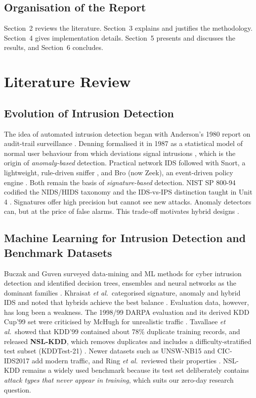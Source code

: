 \documentclass[12pt,a4paper,oneside]{article}
\begin{document}
\subsection{Organisation of the Report}
Section~2 reviews the literature. Section~3 explains and justifies the methodology. Section~4 gives implementation details. Section~5 presents and discusses the results, and Section~6 concludes.

\section{Literature Review}
\subsection{Evolution of Intrusion Detection}
The idea of automated intrusion detection began with Anderson's 1980 report on audit-trail surveillance \cite{anderson1980}. Denning formalised it in 1987 as a statistical model of normal user behaviour from which deviations signal intrusions \cite{denning1987}, which is the origin of \emph{anomaly-based} detection. Practical network IDS followed with Snort, a lightweight, rule-driven sniffer \cite{roesch1999snort}, and Bro (now Zeek), an event-driven policy engine \cite{paxson1999bro}. Both remain the basis of \emph{signature-based} detection. NIST SP 800-94 codified the NIDS/HIDS taxonomy and the IDS-vs-IPS distinction taught in Unit 4 \cite{scarfone2007sp80094}. Signatures offer high precision but cannot see new attacks. Anomaly detectors can, but at the price of false alarms. This trade-off motivates hybrid designs \cite{khraisat2019survey}.

\subsection{Machine Learning for Intrusion Detection and Benchmark Datasets}
Buczak and Guven surveyed data-mining and ML methods for cyber intrusion detection and identified decision trees, ensembles and neural networks as the dominant families \cite{buczak2016survey}. Khraisat \emph{et al.}\ categorised signature, anomaly and hybrid IDS and noted that hybrids achieve the best balance \cite{khraisat2019survey}. Evaluation data, however, has long been a weakness. The 1998/99 DARPA evaluation \cite{lippmann2000darpa} and its derived KDD Cup'99 set were criticised by McHugh for unrealistic traffic \cite{mchugh2000testing}. Tavallaee \emph{et al.}\ showed that KDD'99 contained about 78\% duplicate training records, and released \textbf{NSL-KDD}, which removes duplicates and includes a difficulty-stratified test subset (KDDTest-21) \cite{tavallaee2009detailed}. Newer datasets such as UNSW-NB15 \cite{moustafa2015unsw} and CIC-IDS2017 \cite{sharafaldin2018toward} add modern traffic, and Ring \emph{et al.}\ reviewed their properties \cite{ring2019survey}. NSL-KDD remains a widely used benchmark because its test set deliberately contains \emph{attack types that never appear in training}, which suits our zero-day research question.
\end{document}
